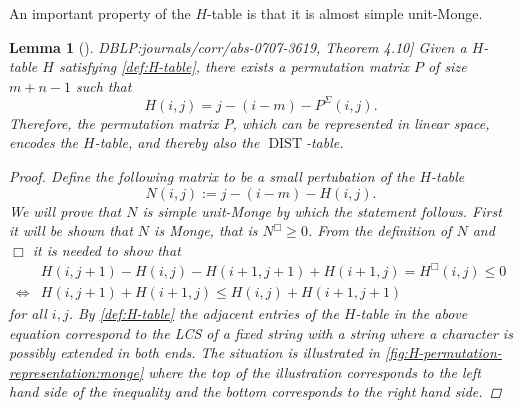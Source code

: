 \documentclass[twoside,11pt,openright]{report}
\newcommand{\DIST}{\operatorname{DIST}}
\newcommand{\refbook}[2]{\cite[#1]{DBLP:journals/corr/abs-0707-3619}, #2}
\newtheorem{lemma}{Lemma}
\begin{document}
An important property of the $H$-table is that it is almost simple unit-Monge.
\begin{lemma}[\refbook{p.-49}{Theorem 4.10}]
  \label{lemma:H-permutation-representation}
  Given a $H$-table $H$ satisfying \cref{def:H-table}, there exists a permutation matrix $P$ of size $m + n - 1$ such that
  \[
    H(i, j) = j - (i - m) - P^{\Sigma}(i, j).
  \]
  Therefore, the permutation matrix $P$, which can be represented in linear space, encodes the $H$-table, and thereby also the $\DIST$-table.

  \begin{proof}
    Define the following matrix to be a small pertubation of the $H$-table
    \[
      N(i, j) := j - (i - m) - H(i, j).
    \]
    We will prove that $N$ is simple unit-Monge by which the statement follows. First it will be shown that $N$ is Monge, that is $N^{\Box} \geq 0$. From the definition of $N$ and $\Box$ it is needed to show that
    \begin{align*}
      &H(i, j + 1) - H(i, j) - H(i + 1, j + 1) + H(i + 1, j) = H^{\Box}(i, j) \leq 0 \\
      \iff &H(i, j + 1) + H(i + 1, j) \leq H(i, j) + H(i + 1, j + 1)
    \end{align*}
    for all $i,j$. By \cref{def:H-table} the adjacent entries of the $H$-table in the above equation correspond to the LCS of a fixed string with a string where a character is possibly extended in both ends. The situation is illustrated in \cref{fig:H-permutation-representation:monge} where the top of the illustration corresponds to the left hand side of the inequality and the bottom corresponds to the right hand side.


\end{proof}
\end{lemma}
\end{document}
